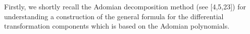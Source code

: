 


Firstly, we shortly recall the Adomian decomposition method (see [4,5,23]) for understanding a construction of the general formula for the differential transformation components which is based on the Adomian polynomials.

